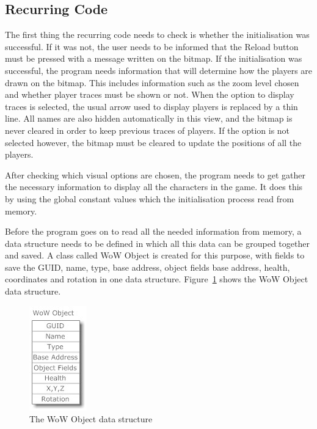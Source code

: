 \subsection{Recurring Code}

The first thing the recurring code needs to check is whether the initialisation was successful. If it was not, the user needs to be informed that the Reload button must be pressed with a message written on the bitmap. If the initialisation was successful, the program needs information that will determine how the players are drawn on the bitmap. This includes information such as the zoom level chosen and whether player traces must be shown or not. When the option to display traces is selected, the usual arrow used to display players is replaced by a thin line. All names are also hidden automatically in this view, and the bitmap is never cleared in order to keep previous traces of players. If the option is not selected however, the bitmap must be cleared to update the positions of all the players.

After checking which visual options are chosen, the program needs to get gather the necessary information to display all the characters in the game. It does this by using the global constant values which the initialisation process read from memory. 

Before the program goes on to read all the needed information from memory, a data structure needs to be defined in which all this data can be grouped together and saved. A class called WoW Object is created for this purpose, with fields to save the GUID, name, type, base address, object fields base address, health, coordinates and rotation in one data structure. Figure~\ref{wowobject} shows the WoW Object data structure.

\begin{figure}[htbp]  %
\centering
\includegraphics[scale = 0.65]{wowobject.jpg}	
\caption{The WoW Object data structure}
\label{wowobject}
\end{figure}


